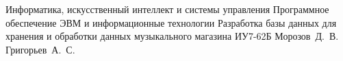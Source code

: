 \documentclass{bmstu}
\begin{document}
\makecourseworktitle
{Информатика, искусственный интеллект и системы управления} %
{Программное обеспечение ЭВМ и информационные технологии} %
{Разработка базы данных для хранения и обработки данных музыкального магазина} 
{ИУ7-62Б} %
{Морозов~Д.~В.} %
{Григорьев~А.~С.}
{}{}

%



\maketableofcontents

%
%







%


\end{document}
